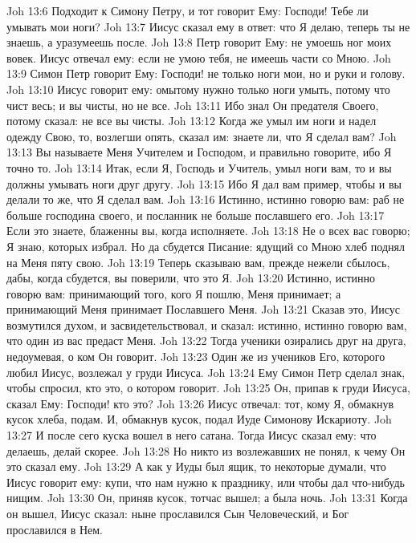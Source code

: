 \vs Joh 13:6 Подходит к Симону Петру, и тот говорит Ему: Господи! Тебе ли умывать мои ноги?
\vs Joh 13:7 Иисус сказал ему в ответ: что Я делаю, теперь ты не знаешь, а уразумеешь после.
\vs Joh 13:8 Петр говорит Ему: не умоешь ног моих вовек. Иисус отвечал ему: если не умою тебя, не имеешь части со Мною.
\vs Joh 13:9 Симон Петр говорит Ему: Господи! не только ноги мои, но и руки и голову.
\vs Joh 13:10 Иисус говорит ему: омытому нужно только ноги умыть, потому что чист весь; и вы чисты, но не все.
\vs Joh 13:11 Ибо знал Он предателя Своего, потому  сказал: не все вы чисты.
\vs Joh 13:12 Когда же умыл им ноги и надел одежду Свою, то, возлегши опять, сказал им: знаете ли, что Я сделал вам?
\vs Joh 13:13 Вы называете Меня Учителем и Господом, и правильно говорите, ибо Я точно то.
\vs Joh 13:14 Итак, если Я, Господь и Учитель, умыл ноги вам, то и вы должны умывать ноги друг другу.
\vs Joh 13:15 Ибо Я дал вам пример, чтобы и вы делали то же, что Я сделал вам.
\vs Joh 13:16 Истинно, истинно говорю вам: раб не больше господина своего, и посланник не больше пославшего его.
\vs Joh 13:17 Если это знаете, блаженны вы, когда исполняете.
\vs Joh 13:18 Не о всех вас говорю; Я знаю, которых избрал. Но да сбудется Писание: ядущий со Мною хлеб поднял на Меня пяту свою.
\vs Joh 13:19 Теперь сказываю вам, прежде нежели  сбылось, дабы, когда сбудется, вы поверили, что это Я.
\vs Joh 13:20 Истинно, истинно говорю вам: принимающий того, кого Я пошлю, Меня принимает; а принимающий Меня принимает Пославшего Меня.
\vs Joh 13:21 Сказав это, Иисус возмутился духом, и засвидетельствовал, и сказал: истинно, истинно говорю вам, что один из вас предаст Меня.
\vs Joh 13:22 Тогда ученики озирались друг на друга, недоумевая, о ком Он говорит.
\vs Joh 13:23 Один же из учеников Его, которого любил Иисус, возлежал у груди Иисуса.
\vs Joh 13:24 Ему Симон Петр сделал знак, чтобы спросил, кто это, о котором говорит.
\vs Joh 13:25 Он, припав к груди Иисуса, сказал Ему: Господи! кто это?
\vs Joh 13:26 Иисус отвечал: тот, кому Я, обмакнув кусок хлеба, подам. И, обмакнув кусок, подал Иуде Симонову Искариоту.
\vs Joh 13:27 И после сего куска вошел в него сатана. Тогда Иисус сказал ему: что делаешь, делай скорее.
\vs Joh 13:28 Но никто из возлежавших не понял, к чему Он это сказал ему.
\vs Joh 13:29 А как у Иуды был ящик, то некоторые думали, что Иисус говорит ему: купи, что нам нужно к празднику, или чтобы дал что-нибудь нищим.
\vs Joh 13:30 Он, приняв кусок, тотчас вышел; а была ночь.
\rsbpar\vs Joh 13:31 Когда он вышел, Иисус сказал: ныне прославился Сын Человеческий, и Бог прославился в Нем.

